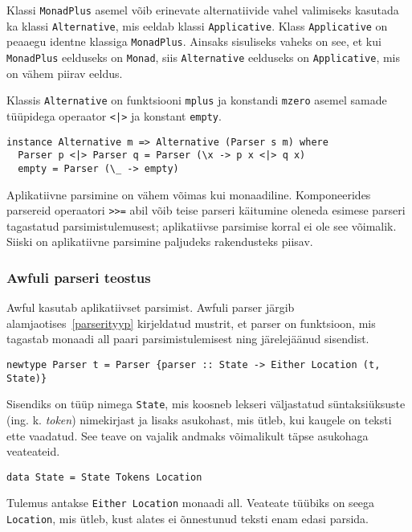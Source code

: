 \documentclass[12pt]{article}
\begin{document}
        Klassi \verb!MonadPlus! asemel võib erinevate alternatiivide vahel valimiseks kasutada ka klassi \verb!Alternative!, mis eeldab klassi \verb!Applicative!. Klass \verb!Applicative! on peaaegu identne klassiga \verb!MonadPlus!. Ainsaks sisuliseks vaheks on see, et kui \verb!MonadPlus! eelduseks on \verb!Monad!, siis \verb!Alternative! eelduseks on \verb!Applicative!, mis on vähem piirav eeldus.

        Klassis \verb!Alternative! on funktsiooni \verb!mplus! ja konstandi \verb!mzero! asemel samade tüüpidega operaator \verb!<|>! ja konstant \verb!empty!.

        \begin{verbatim}instance Alternative m => Alternative (Parser s m) where
  Parser p <|> Parser q = Parser (\x -> p x <|> q x)
  empty = Parser (\_ -> empty)\end{verbatim}

        Aplikatiivne parsimine on vähem võimas kui monaadiline. Komponeerides parsereid operaatori \verb!>>=! abil võib teise parseri käitumine oleneda esimese parseri tagastatud parsimistulemusest; aplikatiivse parsimise korral ei ole see võimalik. Siiski on aplikatiivne parsimine paljudeks rakendusteks piisav.
      \subsubsection{Awfuli parseri teostus}
        Awful kasutab aplikatiivset parsimist. Awfuli parser järgib alamjaotises~\ref{parserityyp} kirjeldatud mustrit, et parser on funktsioon, mis tagastab monaadi all paari parsimistulemisest ning järelejäänud sisendist.

        \begin{verbatim}newtype Parser t = Parser {parser :: State -> Either Location (t, State)}\end{verbatim}

        Sisendiks on tüüp nimega \verb!State!, mis koosneb lekseri väljastatud süntaksiüksuste (ing. k. \textit{token}) nimekirjast ja lisaks asukohast, mis ütleb, kui kaugele on teksti ette vaadatud. See teave on vajalik andmaks võimalikult täpse asukohaga veateateid.

        \begin{verbatim}data State = State Tokens Location\end{verbatim}

        Tulemus antakse \verb!Either Location! monaadi all. Veateate tüübiks on seega \verb!Location!, mis ütleb, kust alates ei õnnestunud teksti enam edasi parsida.
\end{document}
